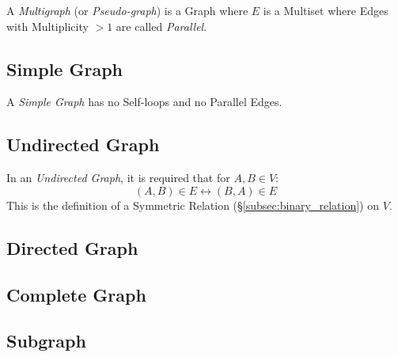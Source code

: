 \documentclass{article}
\begin{document}
A \emph{Multigraph} (or \emph{Pseudo-graph}) is a Graph where $E$ is a
Multiset where Edges with Multiplicity $>1$ are called
\emph{Parallel}.



\subsection{Simple Graph} \label{subsec:simple_graph}

A \emph{Simple Graph} has no Self-loops and no Parallel Edges.



\subsection{Undirected Graph} \label{subsec:undirected_graph}

In an \emph{Undirected Graph}, it is required that for $A,B \in V$:
\[
    (A,B) \in E \leftrightarrow (B,A) \in E
\]
This is the definition of a Symmetric Relation
(\S\ref{subsec:binary_relation}) on $V$.



\subsection{Directed Graph} \label{subsec:directed_graph}

\subsection{Complete Graph} \label{subsec:complete_graph}

\subsection{Subgraph} \label{subsec:subgraphs}
\end{document}

